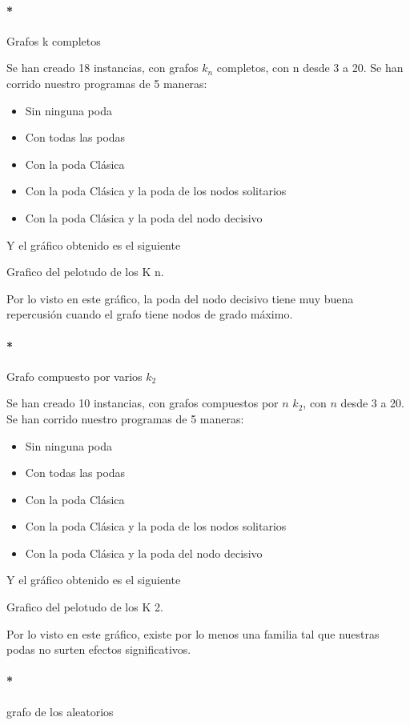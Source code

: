 \paragraph{*} 
Grafos k completos



Se han creado 18 instancias, con grafos $k_n$ completos, con n desde 3 a 20. Se han corrido nuestro programas de 5 maneras:

\begin{itemize}
	\item Sin ninguna poda
	\item Con todas las podas 
	\item Con la poda Clásica
	\item Con la poda Clásica y la poda de los nodos solitarios
	\item Con la poda Clásica y la poda del nodo decisivo
\end{itemize}

Y el gráfico obtenido es el siguiente

Grafico del pelotudo de los K n.

Por lo visto en este gráfico, la poda del nodo decisivo tiene muy buena repercusión cuando el grafo tiene nodos de grado máximo.


\paragraph{*}
Grafo compuesto por varios $k_2$


Se han creado 10 instancias, con grafos compuestos por $n$ $k_2$, con $n$ desde 3 a 20. Se han corrido nuestro programas de 5 maneras:

\begin{itemize}
	\item Sin ninguna poda
	\item Con todas las podas 
	\item Con la poda Clásica
	\item Con la poda Clásica y la poda de los nodos solitarios
	\item Con la poda Clásica y la poda del nodo decisivo
\end{itemize}

Y el gráfico obtenido es el siguiente

Grafico del pelotudo de los K 2.

Por lo visto en este gráfico, existe por lo menos una familia tal que nuestras podas no surten efectos significativos.


\paragraph{*}
grafo de los aleatorios



